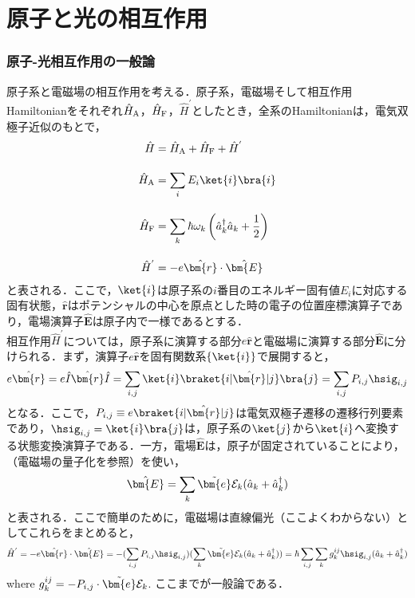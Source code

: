 
\part{原子と光の相互作用}
\section{原子-光相互作用の一般論}
原子系と電磁場の相互作用を考える．原子系，電磁場そして相互作用Hamiltonianをそれぞれ$\hat{H}_{\rm{A}}$，$\hat{H}_{\rm{F}}$，$\hat{H}^{'}$としたとき，全系のHamiltonianは，電気双極子近似のもとで，
\begin{align}
    \hat{H} &= \hat{H}_{\rm{A}}+\hat{H}_{\rm{F}}+\hat{H}^{'}\\[10pt]
    \hat{H}_{\rm{A}}&=\sum_{i}E_{i}\ket{i}\bra{i}\\[10pt]
    \hat{H}_{\rm{F}}&=\sum_{k}\hbar\omega_k\left(\hat{a}_k^{\dag}\hat{a}_k+\frac{1}{2}\right)\\[10pt]
    \hat{H}^{'}&=-e\hat{\bm{r}}\cdot\hat{\bm{E}}
\end{align}
と表される．ここで，$\ket{i}$は原子系の$i$番目のエネルギー固有値$E_i$に対応する固有状態，$\hat{\bm{r}}$はポテンシャルの中心を原点とした時の電子の位置座標演算子であり，電場演算子$\hat{\bm{E}}$は原子内で一様であるとする．\\

相互作用$\hat{H}^{'}$については，原子系に演算する部分$e\hat{\bm{r}}$と電磁場に演算する部分$\hat{\bm{E}}$に分けられる．まず，演算子$e\hat{\bm{r}}$を固有関数系$\{\ket{i}\}$で展開すると，
\begin{equation}
    e\hat{\bm{r}}=e\hat{I}\hat{\bm{r}}\hat{I}
    =\sum_{i,j}\ket{i}\braket{i|\hat{\bm{r}}|j}\bra{j}
    =\sum_{i,j}P_{i,j}\hsig_{i,j}
\end{equation}
となる．ここで，$P_{i,j}\equiv e\braket{i|\hat{\bm{r}}|j}$は電気双極子遷移の遷移行列要素であり，$\hsig_{i,j}=\ket{i}\bra{j}$は，原子系の$\ket{j}$から$\ket{i}$へ変換する状態変換演算子である．一方，電場$\hat{\bm{E}}$は，原子が固定されていることにより，（電磁場の量子化を参照）を使い，
\begin{equation}
    \hat{\bm{E}}=\sum_{k}{\Tilde{\bm{e}}}\mathcal{E}_k(\hat{a}_k+\hat{a}_k^{\dag})
\end{equation}
と表される．ここで簡単のために，電磁場は直線偏光（ここよくわからない）としてこれらをまとめると，
\begin{equation}
    \hat{H}^{'}=-e\hat{\bm{r}}\cdot\hat{\bm{E}}
    =-(\sum_{i,j}P_{i,j}\hsig_{i,j})(\sum_{k}{\Tilde{\bm{e}}}\mathcal{E}_k(\hat{a}_k+\hat{a}_k^{\dag}))
    =\hbar\sum_{i,j}\sum_{k}g_k^{ij}\hsig_{i,j}(\hat{a}_k+\hat{a}_k^{\dag})
\end{equation}
where $g_k^{ij}=-P_{i,j}\cdot\Tilde{\bm{e}}\mathcal{E}_k$.
ここまでが一般論である．



